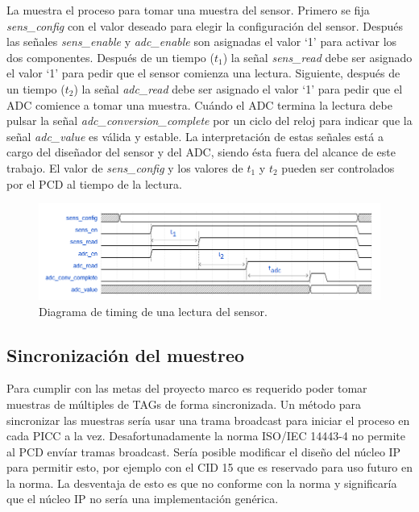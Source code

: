 \documentclass[a4paper, twoside, 11pt]{report}
\begin{document}
La  muestra el proceso para tomar una muestra del sensor. Primero se fija \textit{sens\_config} con el valor deseado para elegir la configuración del sensor. Después las señales \textit{sens\_enable} y \textit{adc\_enable} son asignadas el valor ‘1’ para activar los dos componentes. Después de un tiempo ($t_1$) la señal \textit{sens\_read} debe ser asignado el valor ‘1’ para pedir que el sensor comienza una lectura. Siguiente, después de un tiempo ($t_2$) la señal \textit{adc\_read} debe ser asignado el valor ‘1’ para pedir que el ADC comience a tomar una muestra. Cuándo el ADC termina la lectura debe pulsar la señal \textit{adc\_conversion\_complete} por un ciclo del reloj para indicar que la señal \textit{adc\_value} es válida y estable. La interpretación de estas señales está a cargo del diseñador del sensor y del ADC, siendo ésta fuera del alcance de este trabajo. El valor de \textit{sens\_config} y los valores de $t_1$ y $t_2$ pueden ser controlados por el PCD al tiempo de la lectura.

\begin{figure}[htb]
  \centering
  \includegraphics[width=1.0\textwidth]{./img/sens_adc}
  \caption{Diagrama de timing de una lectura del sensor.}
  \label{fig:sens_adc}
\end{figure}

\FloatBarrier
\subsection{Sincronización del muestreo}

Para cumplir con las metas del proyecto marco es requerido poder tomar muestras de múltiples de TAGs de forma sincronizada. Un método para sincronizar las muestras sería usar una trama broadcast para iniciar el proceso en cada PICC a la vez. Desafortunadamente la norma ISO/IEC 14443-4 no permite al PCD envíar tramas broadcast. Sería posible modificar el diseño del núcleo IP para permitir esto, por ejemplo con el CID 15 que es reservado para uso futuro en la norma. La desventaja de esto es que no conforme con la norma y significaría que el núcleo IP no sería una implementación genérica. 
\end{document}
